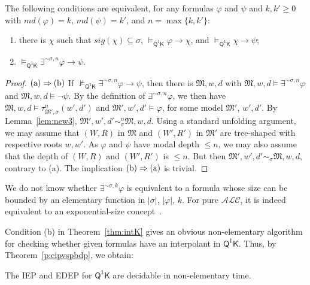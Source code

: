 \documentclass{lmcs} %
\theoremstyle{plain}\newtheorem{satz}[thm]{Satz} %
\newcommand{\md}{\textit{md}}
\newcommand{\sig}{\mathit{sig}}
\newcommand{\FOMK}{\ensuremath{\mathsf{Q^1K}}}
\begin{document}
\begin{thm}\label{thm:intK} 
The following conditions are equivalent, for any formulas $\varphi$ and $\psi$ and $k,k'\geq 0$ with $\md(\varphi)=k$, $\md(\psi) = k'$, and $n = \max{\{k,k'\}}$\textup{:}
%
\begin{enumerate}[style=multiline,leftmargin=0.7cm]
\item[\rm\textup{(a)}] there is $\chi$ such that $\sig(\chi) \subseteq \sigma$, $\models_\FOMK \varphi \rightarrow \chi$, and \mbox{$\models_\FOMK \chi \rightarrow \psi$\textup{;}}

\item[\rm\textup{(b)}] $\models_\FOMK \exists^{\sim\sigma,n}\varphi \rightarrow \psi$.
\end{enumerate}
\end{thm}
%
\begin{proof}
${\rm(a)} \Rightarrow {\rm (b)}$ If $\not\models_\FOMK \exists^{\sim\sigma,n}\varphi \rightarrow \psi$, then there is $\mathfrak{M},w, d$ with $\mathfrak{M}, w, d \models \exists^{\sim\sigma,n}\varphi$ and $\mathfrak{M},w, d \models \neg\psi$. By the definition of $\exists^{\sim\sigma,n}\varphi$, we then have $\mathfrak{M},w,d\models \tau_{\mathfrak{M}',\sigma}^{n}(w',d')$ and $\mathfrak{M}',w',d'\models \varphi$, for some model $\mathfrak{M}'$, $w',d'$. By Lemma~\ref{lem:new3}, $\mathfrak{M}',w',d' \sim_{\sigma}^{n} \mathfrak{M},w,d$. Using a standard unfolding argument, we may assume that $(W,R)$ in $\mathfrak M$ and $(W',R')$ in $\mathfrak M'$ are tree-shaped with respective roots $w,w'$. As $\varphi$ and $\psi$ have modal depth $\leq n$, we may also assume that the depth of $(W,R)$ and $(W',R')$ is $\leq n$. But then $\mathfrak{M}',w',d'\sim_{\sigma}\mathfrak{M},w,d$, contrary to (a). The implication ${\rm(b)} \Rightarrow {\rm (a)}$ is trivial.
\end{proof}

We do not know whether $\exists^{\sim\sigma,k}\varphi$ is equivalent to a formula whose size can be bounded by an elementary function in $|\sigma|$, $|\varphi|$, $k$. For pure $\mathcal{ALC}$, it is indeed equivalent to an exponential-size concept~\cite{TenEtAl06}.

Condition (b) in Theorem~\ref{thm:intK} gives an obvious non-elementary algorithm for checking whether given formulas have an interpolant in $\FOMK$. Thus, by Theorem~\ref{p:cipvspbdp}, we obtain:

\begin{thm}
The IEP and EDEP for $\FOMK$ are decidable in non-elementary time.
\end{thm}
\end{document}
